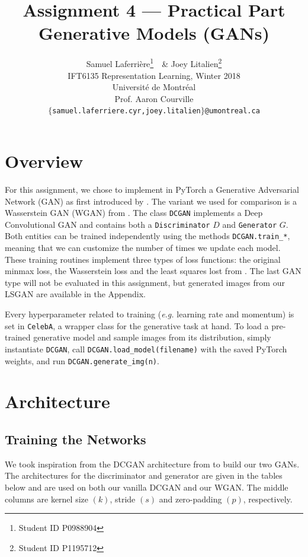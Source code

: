 \documentclass[table]{article}
\title{Assignment 4 --- Practical Part \\
Generative Models (GANs)}
\author{Samuel Laferri\`ere\thanks{Student ID P0988904}\ \, \& Joey Litalien\thanks{Student ID P1195712} \\
IFT6135 Representation Learning, Winter 2018\\
Universit\'e de Montr\'eal\\
Prof. Aaron Courville \\
\texttt{$\{$samuel.laferriere.cyr,joey.litalien$\}$@umontreal.ca}}
\def\*#1{\mathbf{#1}}
\newcommand{\code}[1]{{\color{Blue}\small\texttt{#1}}}
\begin{document}
\maketitle
\thispagestyle{empty}

\section{Overview}

For this assignment, we chose to implement in PyTorch a Generative Adversarial Network (GAN) as first introduced by \cite{gan}. The variant we used for comparison is a Wasserstein GAN (WGAN) from \cite{wgan}. The class \code{DCGAN} implements a Deep Convolutional GAN and contains both a \code{Discriminator} $D$ and \code{Generator} $G$. Both entities can be trained independently using the methods \code{DCGAN.train\_*}, meaning that we can customize the number of times we update each model. These training routines implement three types of loss functions: the original minmax loss, the Wasserstein loss and the least squares lost from \cite{lsgan}. The last GAN type will not be evaluated in this assignment, but generated images from our LSGAN are available in the Appendix.

Every hyperparameter related to training (\textit{e.g.} learning rate and momentum) is set in \code{CelebA}, a wrapper class for the generative task at hand. To load a pre-trained generative model and sample images from its distribution, simply instantiate \code{DCGAN}, call \code{DCGAN.load_model(filename)} with the saved PyTorch weights, and run \code{DCGAN.generate_img(n)}.


\section{Architecture}
\subsection{Training the Networks}

We took inspiration from the DCGAN architecture from \cite{dcgan} to build our two GANs. The architectures for the discriminator and generator are given in the tables below and are used on both our vanilla DCGAN and our WGAN. The middle columns are kernel size $(k)$, stride $(s)$ and zero-padding $(p)$, respectively.
\end{document}
